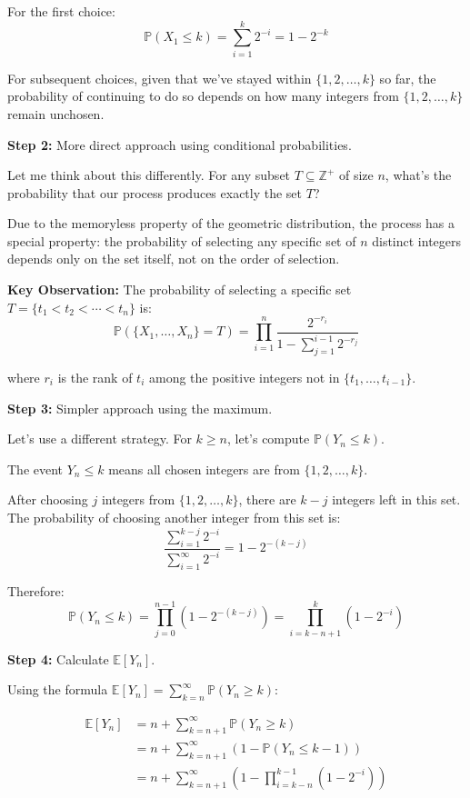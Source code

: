 \documentclass[12pt,a4paper]{article}
\theoremstyle{definition}
\begin{document}
    For the first choice:
    $$\mathbb{P}(X_1 \leq k) = \sum_{i=1}^k 2^{-i} = 1 - 2^{-k}$$

    For subsequent choices, given that we've stayed within $\{1, 2, \ldots, k\}$ so far, the probability of continuing to do so depends on how many integers from $\{1, 2, \ldots, k\}$ remain unchosen.

    \textbf{Step 2:} More direct approach using conditional probabilities.

    Let me think about this differently. For any subset $T \subseteq \mathbb{Z}^+$ of size $n$, what's the probability that our process produces exactly the set $T$?

    Due to the memoryless property of the geometric distribution, the process has a special property: the probability of selecting any specific set of $n$ distinct integers depends only on the set itself, not on the order of selection.

    \textbf{Key Observation:} The probability of selecting a specific set $T = \{t_1 < t_2 < \cdots < t_n\}$ is:
    $$\mathbb{P}(\{X_1, \ldots, X_n\} = T) = \prod_{i=1}^n \frac{2^{-r_i}}{1 - \sum_{j=1}^{i-1} 2^{-r_j}}$$

    where $r_i$ is the rank of $t_i$ among the positive integers not in $\{t_1, \ldots, t_{i-1}\}$.

    \textbf{Step 3:} Simpler approach using the maximum.

    Let's use a different strategy. For $k \geq n$, let's compute $\mathbb{P}(Y_n \leq k)$.

    The event $Y_n \leq k$ means all chosen integers are from $\{1, 2, \ldots, k\}$.

    After choosing $j$ integers from $\{1, 2, \ldots, k\}$, there are $k-j$ integers left in this set. The probability of choosing another integer from this set is:
    $$\frac{\sum_{i=1}^{k-j} 2^{-i}}{\sum_{i=1}^{\infty} 2^{-i}} = 1 - 2^{-(k-j)}$$

    Therefore:
    $$\mathbb{P}(Y_n \leq k) = \prod_{j=0}^{n-1} (1 - 2^{-(k-j)}) = \prod_{i=k-n+1}^{k} (1 - 2^{-i})$$

    \textbf{Step 4:} Calculate $\mathbb{E}[Y_n]$.

    Using the formula $\mathbb{E}[Y_n] = \sum_{k=n}^{\infty} \mathbb{P}(Y_n \geq k)$:

    \begin{align}
        \mathbb{E}[Y_n] &= n + \sum_{k=n+1}^{\infty} \mathbb{P}(Y_n \geq k) \\
        &= n + \sum_{k=n+1}^{\infty} (1 - \mathbb{P}(Y_n \leq k-1)) \\
        &= n + \sum_{k=n+1}^{\infty} \left(1 - \prod_{i=k-n}^{k-1} (1 - 2^{-i})\right)
    \end{align}
\end{document}
